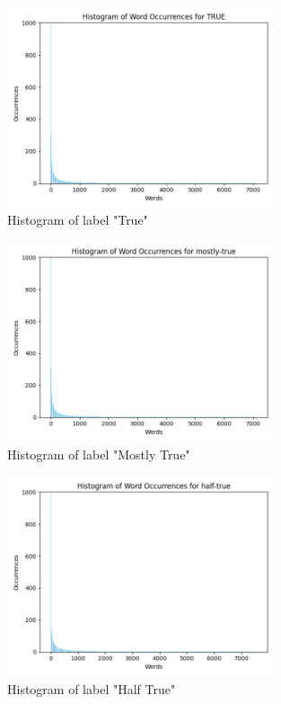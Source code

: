 \documentclass[12pt]{article}
\begin{document}
\begin{figure}[H]
	\begin{center}
 		\includegraphics[width = 0.7\textwidth]{Images/true-histogram.png}
 		\caption{Histogram of label "True"}
 		\label{fig:1}
	\end{center} 
\end{figure}

\begin{figure}[H]
	\begin{center}
 		\includegraphics[width = 0.7\textwidth]{Images/mostly-true-histogram.png}
 		\caption{Histogram of label "Mostly True"}
 		\label{fig:1}
	\end{center} 
\end{figure}

\begin{figure}[H]
	\begin{center}
 		\includegraphics[width = 0.7\textwidth]{Images/half-true-histogram.png}
 		\caption{Histogram of label "Half True"}
 		\label{fig:1}
	\end{center} 
\end{figure}
\end{document}
